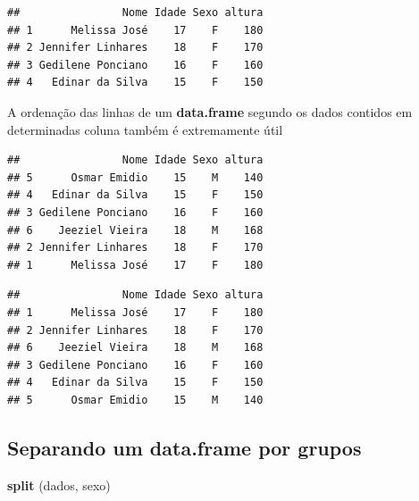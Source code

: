 \documentclass[
]{book}
\newenvironment{Shaded}{\begin{snugshade}}{\end{snugshade}}
\newcommand{\KeywordTok}[1]{\textcolor[rgb]{0.13,0.29,0.53}{\textbf{#1}}}
\newcommand{\NormalTok}[1]{#1}
\newcommand{\OperatorTok}[1]{\textcolor[rgb]{0.81,0.36,0.00}{\textbf{#1}}}
\begin{document}
\begin{verbatim}
##                Nome Idade Sexo altura
## 1      Melissa José    17    F    180
## 2 Jennifer Linhares    18    F    170
## 3 Gedilene Ponciano    16    F    160
## 4   Edinar da Silva    15    F    150
\end{verbatim}

A ordenação das linhas de um \textbf{data.frame} segundo os dados contidos em determinadas coluna também é extremamente útil

\begin{Shaded}
\end{Shaded}

\begin{verbatim}
##                Nome Idade Sexo altura
## 5      Osmar Emidio    15    M    140
## 4   Edinar da Silva    15    F    150
## 3 Gedilene Ponciano    16    F    160
## 6    Jeeziel Vieira    18    M    168
## 2 Jennifer Linhares    18    F    170
## 1      Melissa José    17    F    180
\end{verbatim}

\begin{Shaded}
\end{Shaded}

\begin{verbatim}
##                Nome Idade Sexo altura
## 1      Melissa José    17    F    180
## 2 Jennifer Linhares    18    F    170
## 6    Jeeziel Vieira    18    M    168
## 3 Gedilene Ponciano    16    F    160
## 4   Edinar da Silva    15    F    150
## 5      Osmar Emidio    15    M    140
\end{verbatim}

\hypertarget{separando-um-data.frame-por-grupos}{%
\subsection{Separando um data.frame por grupos}\label{separando-um-data.frame-por-grupos}}

\begin{Shaded}
\begin{Highlighting}[]
\KeywordTok{split}\NormalTok{ (dados, sexo)}
\end{Highlighting}
\end{Shaded}
\end{document}
